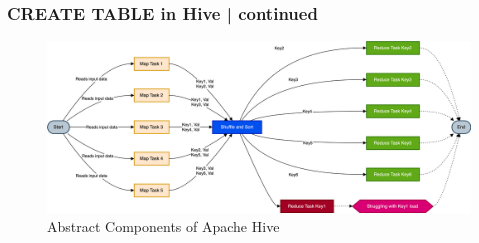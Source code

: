 		\begin{frame}
			\frametitle{CREATE TABLE in Hive | continued}  
			\vspace{-0.5cm}		
			\begin{tcolorbox}[colback=white,colframe=black,title= Part 7: Data Skewing]					
				\begin{figure}
					\includegraphics[width=\textwidth,height=.7\textheight,keepaspectratio]{./Figures/chapter-03/dwh_hive-skweed_dt_mr.png}	
					\caption{Abstract Components of Apache Hive}
				\end{figure}
			\end{tcolorbox}
		\end{frame}	
		
